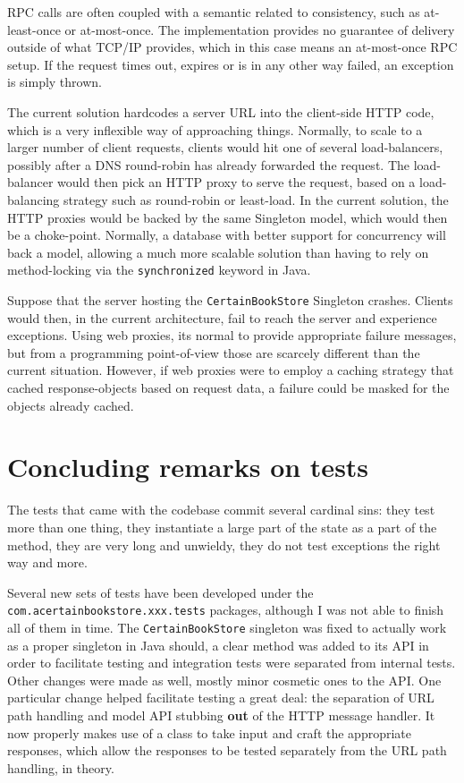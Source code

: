 RPC calls are often coupled with a semantic related to consistency, such as
at-least-once or at-most-once. The implementation provides no guarantee of
delivery outside of what TCP/IP provides, which in this case means an
at-most-once RPC setup. If the request times out, expires or is in any other way
failed, an exception is simply thrown.

The current solution hardcodes a server URL into the client-side HTTP code,
which is a very inflexible way of approaching things. Normally, to scale to a
larger number of client requests, clients would hit one of several
load-balancers, possibly after a DNS round-robin has already forwarded the
request. The load-balancer would then pick an HTTP proxy to serve the request,
based on a load-balancing strategy such as round-robin or least-load. In the
current solution, the HTTP proxies would be backed by the same Singleton model,
which would then be a choke-point. Normally, a database with better support for
concurrency will back a model, allowing a much more scalable solution than
having to rely on method-locking via the \texttt{synchronized} keyword in Java.

Suppose that the server hosting the \texttt{CertainBookStore} Singleton crashes.
Clients would then, in the current architecture, fail to reach the server and
experience exceptions. Using web proxies, its normal to provide appropriate
failure messages, but from a programming point-of-view those are scarcely
different than the current situation. However, if web proxies were to employ a
caching strategy that cached response-objects based on request data, a failure
could be masked for the objects already cached.

\section{Concluding remarks on tests}
The tests that came with the codebase commit several cardinal sins: they test
more than one thing, they instantiate a large part of the state as a part of the
method, they are very long and unwieldy, they do not test exceptions the right
way and more.

Several new sets of tests have been developed under the
\texttt{com.acertainbookstore.xxx.tests} packages, although I was not able to
finish all of them in time. The \texttt{CertainBookStore} singleton was fixed to
actually work as a proper singleton in Java should, a clear method was added to
its API in order to facilitate testing and integration tests were separated from
internal tests. Other changes were made as well, mostly minor cosmetic ones to
the API. One particular change helped facilitate testing a great deal: the
separation of URL path handling and model API stubbing \textbf{out} of the HTTP
message handler. It now properly makes use of a class to take input and craft
the appropriate responses, which allow the responses to be tested separately
from the URL path handling, in theory.

